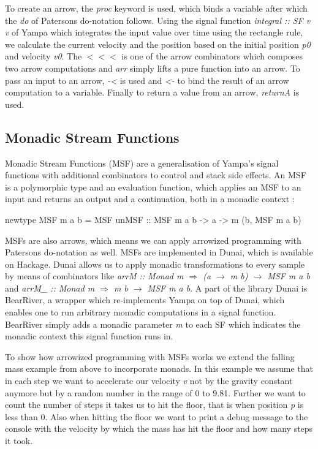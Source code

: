 To create an arrow, the \textit{proc} keyword is used, which binds a variable after which the \textit{do} of Patersons do-notation \cite{paterson_new_2001} follows. Using the signal function \textit{integral :: SF v v} of Yampa which integrates the input value over time using the rectangle rule, we calculate the current velocity and the position based on the initial position \textit{p0} and velocity \textit{v0}. The $<<<$ is one of the arrow combinators which composes two arrow computations and \textit{arr} simply lifts a pure function into an arrow. To pass an input to an arrow, \textit{-<} is used and \textit{<-} to bind the result of an arrow computation to a variable. Finally to return a value from an arrow, \textit{returnA} is used.

\subsection{Monadic Stream Functions}
\label{sec:back_msf}

Monadic Stream Functions (MSF) are a generalisation of Yampa's signal functions with additional combinators to control and stack side effects. An MSF is a polymorphic type and an evaluation function, which applies an MSF to an input and returns an output and a continuation, both in a monadic context \cite{perez_functional_2016, perez_extensible_2017}:
\begin{HaskellCode}
newtype MSF m a b =
  MSF { unMSF :: MSF m a b -> a -> m (b, MSF m a b) }
\end{HaskellCode}

MSFs are also arrows, which means we can apply arrowized programming with Patersons do-notation as well. MSFs are implemented in Dunai, which is available on Hackage. Dunai allows us to apply monadic transformations to every sample by means of combinators like \textit{arrM :: Monad m $\Rightarrow$ (a $\rightarrow$ m b) $\rightarrow$ MSF m a b} and \textit{arrM\_ :: Monad m $\Rightarrow$ m b $\rightarrow$ MSF m a b}. A part of the library Dunai is BearRiver, a wrapper which re-implements Yampa on top of Dunai, which enables one to run arbitrary monadic computations in a signal function. BearRiver simply adds a monadic parameter \textit{m} to each SF which indicates the monadic context this signal function runs in.

To show how arrowized programming with MSFs works we extend the falling mass example from above to incorporate monads. In this example we assume that in each step we want to accelerate our velocity \textit{v} not by the gravity constant anymore but by a random number in the range of 0 to 9.81. Further we want to count the number of steps it takes us to hit the floor, that is when position \textit{p} is less than 0. Also when hitting the floor we want to print a debug message to the console with the velocity by which the mass has hit the floor and how many steps it took.

